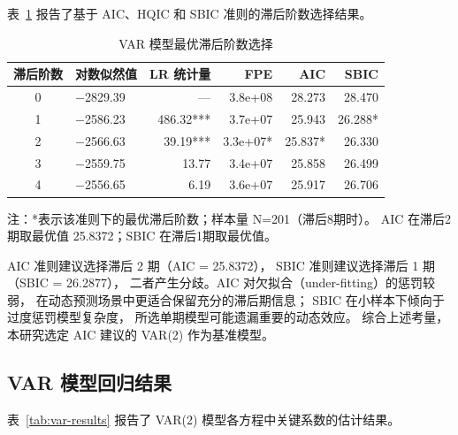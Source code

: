 表~\ref{tab:lag-selection} 报告了基于 AIC、HQIC 和 SBIC 准则的滞后阶数选择结果。

\begin{table}[htbp]
    \centering
    \caption{VAR 模型最优滞后阶数选择}
    \label{tab:lag-selection}
    \begin{tabularx}{\textwidth}{cXrrrr}
        \toprule
        滞后阶数 & 对数似然值 & LR 统计量 & FPE & AIC & SBIC \\
        \midrule
        0 & $-$2829.39 & --- & 3.8e+08 & 28.273 & 28.470 \\
        1 & $-$2586.23 & 486.32*** & 3.7e+07 & 25.943 & 26.288* \\
        2 & $-$2566.63 & 39.19*** & 3.3e+07* & 25.837* & 26.330 \\
        3 & $-$2559.75 & 13.77 & 3.4e+07 & 25.858 & 26.499 \\
        4 & $-$2556.65 & 6.19 & 3.6e+07 & 25.917 & 26.706 \\
        \bottomrule
    \end{tabularx}
    \begin{minipage}{\textwidth}
        \vspace{0.3em}
        \footnotesize 注：*表示该准则下的最优滞后阶数；样本量 N=201（滞后8期时）。
              AIC 在滞后2期取最优值 25.8372；SBIC 在滞后1期取最优值。
    \end{minipage}
\end{table}

AIC 准则建议选择滞后 2 期（AIC = 25.8372），
SBIC 准则建议选择滞后 1 期（SBIC = 26.2877），
二者产生分歧。AIC 对欠拟合（under-fitting）的惩罚较弱，
在动态预测场景中更适合保留充分的滞后期信息；
SBIC 在小样本下倾向于过度惩罚模型复杂度，
所选单期模型可能遗漏重要的动态效应。
综合上述考量，本研究选定 AIC 建议的 VAR(2) 作为基准模型。

\subsection{VAR 模型回归结果}

表~\ref{tab:var-results} 报告了 VAR(2) 模型各方程中关键系数的估计结果。

